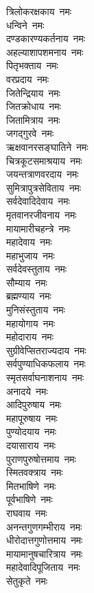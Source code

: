 \begin{multicols}{2}
\begin{flushleft}
त्रिलोकरक्षकाय~नमः\\
धन्विने~नमः\\
दण्डकारण्यकर्तनाय~नमः\\
अहल्याशापशमनाय~नमः\\
पितृभक्ताय~नमः\\
वरप्रदाय~नमः\\
जितेन्द्रियाय~नमः\\
जितक्रोधाय~नमः\\
जितामित्राय~नमः\\
जगद्गुरवे~नमः\hfill{}\\
ऋक्षवानरसङ्घातिने~नमः\\
चित्रकूटसमाश्रयाय~नमः\\
जयन्तत्राणवरदाय~नमः\\
सुमित्रापुत्रसेविताय~नमः\\
सर्वदेवादिदेवाय~नमः\\
मृतवानरजीवनाय~नमः\\
मायामारीचहन्त्रे~नमः\\
महादेवाय~नमः\\
महाभुजाय~नमः\\
सर्वदेवस्तुताय~नमः\hfill{}\\
सौम्याय~नमः\\
ब्रह्मण्याय~नमः\\
मुनिसंस्तुताय~नमः\\
महायोगाय~नमः\\
महोदाराय~नमः\\
सुग्रीवेप्सितराज्यदाय~नमः\\
सर्वपुण्याधिकफलाय~नमः\\
स्मृतसर्वाघनाशनाय~नमः\\
अनादये~नमः\\
आदिपुरुषाय~नमः\hfill{}\\
महापूरुषाय~नमः\\
पुण्योदयाय~नमः\\
दयासाराय~नमः\\
पुराणपुरुषोत्तमाय~नमः\\
स्मितवक्त्राय~नमः\\
मितभाषिणे~नमः\\
पूर्वभाषिणे~नमः\\
राघवाय~नमः\\
अनन्तगुणगम्भीराय~नमः\\
धीरोदात्तगुणोत्तमाय~नमः\hfill{}\\
मायामानुषचारित्राय~नमः\\
महादेवादिपूजिताय~नमः\\
सेतुकृते~नमः\\

\end{flushleft}
\end{multicols}
